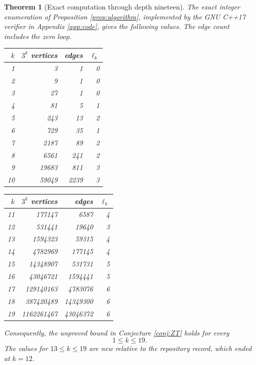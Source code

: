\documentclass[11pt]{article}
\newtheorem{theorem}{Theorem}[section]
\theoremstyle{definition}
\theoremstyle{remark}
\begin{document}
\begin{theorem}[Exact computation through depth nineteen]
\label{thm:computation}
The exact integer enumeration of Proposition \ref{prop:algorithm}, implemented by the GNU C++17 verifier in Appendix \ref{app:code}, gives the following values. The edge count includes the zero loop.

\begin{center}
\begin{tabular}{r|r|r|r}
$k$ & $3^k$ vertices & edges & $\ell_k$\\ \hline
1 & 3 & 1 & 0\\
2 & 9 & 1 & 0\\
3 & 27 & 1 & 0\\
4 & 81 & 5 & 1\\
5 & 243 & 13 & 2\\
6 & 729 & 35 & 1\\
7 & 2187 & 89 & 2\\
8 & 6561 & 241 & 2\\
9 & 19683 & 811 & 3\\
10 & 59049 & 2239 & 3
\end{tabular}
\qquad
\begin{tabular}{r|r|r|r}
$k$ & $3^k$ vertices & edges & $\ell_k$\\ \hline
11 & 177147 & 6587 & 4\\
12 & 531441 & 19640 & 3\\
13 & 1594323 & 59315 & 4\\
14 & 4782969 & 177145 & 4\\
15 & 14348907 & 531731 & 5\\
16 & 43046721 & 1594441 & 5\\
17 & 129140163 & 4783076 & 6\\
18 & 387420489 & 14349300 & 6\\
19 & 1162261467 & 43046372 & 6
\end{tabular}
\end{center}

Consequently, the unproved bound in Conjecture \ref{conj:ZT} holds for every
\[
1\le k\le19.
\]
The values for $13\le k\le19$ are new relative to the repository record, which ended at $k=12$.
\end{theorem}
\end{document}
